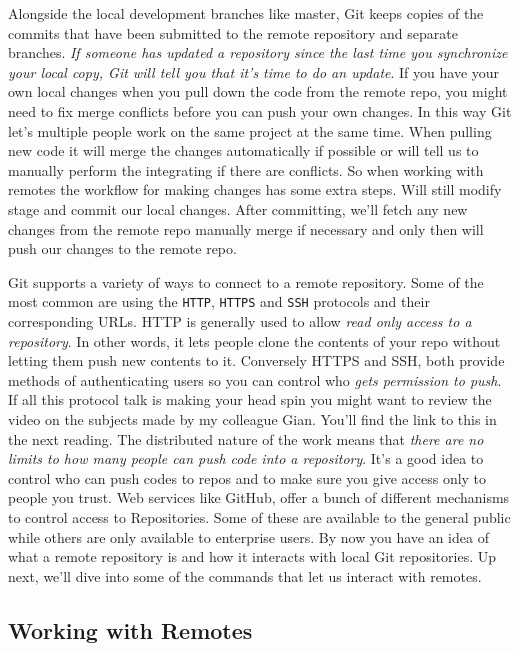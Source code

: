 Alongside the local development branches like master, Git keeps copies of the commits that have been submitted to the remote repository and separate branches. 
\textit{If someone has updated a repository since the last time you synchronize your local copy, Git will tell you that it's time to do an update}. 
If you have your own local changes when you pull down the code from the remote repo, you might need to fix merge conflicts before you can push your own changes. 
In this way Git let's multiple people work on the same project at the same time. When pulling new code it will merge the changes automatically if possible or will tell us to manually perform the integrating if there are conflicts. 
So when working with remotes the workflow for making changes has some extra steps. 
Will still modify stage and commit our local changes. After committing, we'll fetch any new changes from the remote repo manually merge if necessary and only then will push our changes to the remote repo. 

Git supports a variety of ways to connect to a remote repository. Some of the most common are using the \verb|HTTP|, \verb|HTTPS| and \verb|SSH| protocols and their corresponding URLs. 
HTTP is generally used to allow\textit{ read only access to a repository}. In other words, it lets people clone the contents of your repo without letting them push new contents to it. 
Conversely HTTPS and SSH, both provide methods of authenticating users so you can control who \textit{gets permission to push}. If all this protocol talk is making your head spin you might want to review the video on the subjects made by my colleague Gian. You'll find the link to this in the next reading.
The distributed nature of the work means that\textit{ there are no limits to how many people can push code into a repository}. It's a good idea to control who can push codes to repos and to make sure you give access only to people you trust. Web services like GitHub, offer a bunch of different mechanisms to control access to Repositories. Some of these are available to the general public while others are only available to enterprise users. By now you have an idea of what a remote repository is and how it interacts with local Git repositories. Up next, we'll dive into some of the commands that let us interact with remotes.

\subsection{Working with Remotes} \label{W302b}

